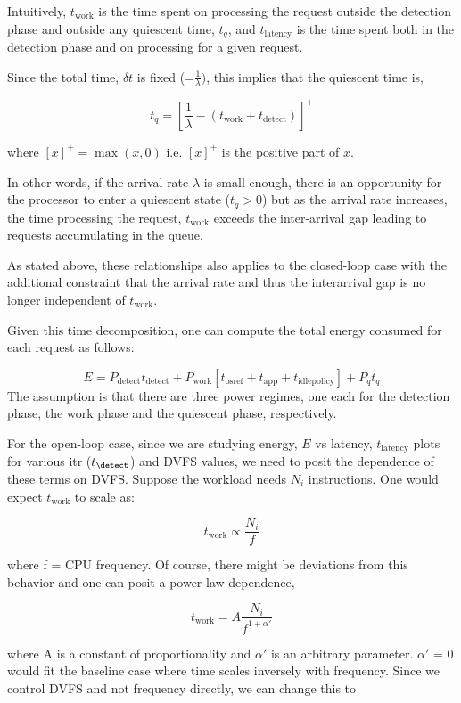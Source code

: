 Intuitively, $t_{\text{work}}$ is the time spent on processing the request outside the detection phase and outside any quiescent time, $t_q$, and $t_{\text{latency}}$ is the time spent both in the detection phase and on processing for a given request.

Since the total time, $\delta t$ is fixed (=$\frac{1}{\lambda})$, this implies that the quiescent time is,

$$t_q = \left[\frac{1}{\lambda} - (t_\text{work} + t_{\text{detect}})\right]^+$$

where $[x]^+ = \max(x,0)$ i.e. $[x]^+$ is the positive part of $x$. 

In other words, if the arrival rate $\lambda$ is small enough, there is an opportunity for the processor to enter a quiescent state ($t_q > 0$) but as the arrival rate increases, the time processing the request, $t_\text{work}$ exceeds the inter-arrival gap leading to requests accumulating in the queue. 

As stated above, these relationships also applies to the closed-loop case with the additional constraint that the arrival rate and thus the interarrival gap is no longer independent of $t_\text{work}$.

Given this time decomposition, one can compute the total energy consumed for each request as follows:

\begin{equation}
  E = P_\text{detect} t_{\text{detect}} + P_{\text{work}} \left[t_{\text{osref}} + t_{\text{app}} + t_{\text{idlepolicy}}\right] + P_q t_q 
\label{eq:energy}
\end{equation}
The assumption is that there are three power regimes, one each for the detection phase, the work phase and the quiescent phase, respectively.

For the open-loop case, since we are studying energy, $E$ vs latency, $t_{\text{latency}}$ plots for various itr ($t_{\detect}$) and DVFS values, we need to posit the dependence of these terms on DVFS. Suppose the workload needs $N_i$ instructions. One would expect $t_\text{work}$ to scale as:

$$t_{\text{work}} \propto \frac{N_i}{f}$$

where f = CPU frequency. Of course, there might be deviations from this behavior and one can posit a power law dependence,

$$t_{\text{work}} = A\frac{N_i}{f^{1+\alpha'}}$$

where A is a constant of proportionality and $\alpha'$ is an arbitrary parameter. $\alpha'$ = 0 would fit the baseline case where time scales inversely with frequency. Since we control DVFS and not frequency directly, we can change this to

